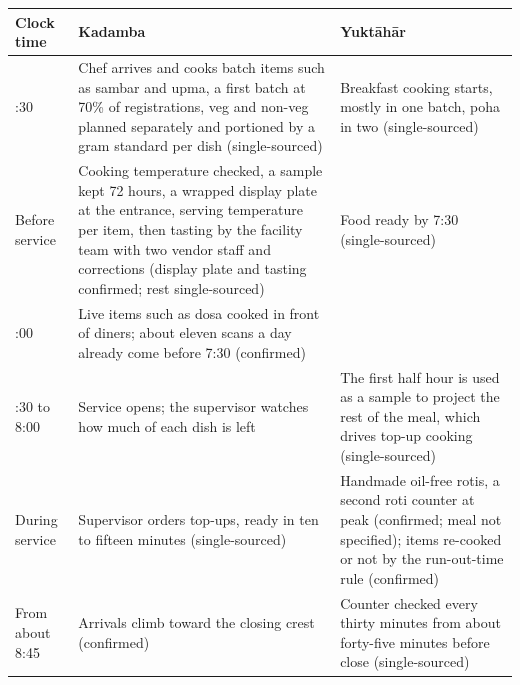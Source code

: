 \documentclass[
  10pt,
  table]{article}
\newcounter{none} %
\begin{document}
{\def\LTcaptype{none} %
\begin{longtable}[]{@{}
  >{\raggedright\arraybackslash}p{}
  >{\raggedright\arraybackslash}p{}
  >{\raggedright\arraybackslash}p{}@{}}
\toprule\noalign{}
\begin{minipage}[b]{\linewidth}\raggedright
\cellcolor{pblue}\color{white}\bfseries Clock time
\end{minipage} & \begin{minipage}[b]{\linewidth}\raggedright
\cellcolor{pblue}\color{white}\bfseries Kadamba
\end{minipage} & \begin{minipage}[b]{\linewidth}\raggedright
\cellcolor{pblue}\color{white}\bfseries Yuktāhār
\end{minipage} \\
\midrule\noalign{}
\endhead
\bottomrule\noalign{}
\endlastfoot
5:30 & Chef arrives and cooks batch items such as sambar and upma, a first batch at 70\% of registrations, veg and non-veg planned separately and portioned by a gram standard per dish (single-sourced) & Breakfast cooking starts, mostly in one batch, poha in two (single-sourced) \\
Before service & Cooking temperature checked, a sample kept 72 hours, a wrapped display plate at the entrance, serving temperature per item, then tasting by the facility team with two vendor staff and corrections (display plate and tasting confirmed; rest single-sourced) & Food ready by 7:30 (single-sourced) \\
7:00 & Live items such as dosa cooked in front of diners; about eleven scans a day already come before 7:30 (confirmed) & \\
7:30 to 8:00 & Service opens; the supervisor watches how much of each dish is left & The first half hour is used as a sample to project the rest of the meal, which drives top-up cooking (single-sourced) \\
During service & Supervisor orders top-ups, ready in ten to fifteen minutes (single-sourced) & Handmade oil-free rotis, a second roti counter at peak (confirmed; meal not specified); items re-cooked or not by the run-out-time rule (confirmed) \\
From about 8:45 & Arrivals climb toward the closing crest (confirmed) & Counter checked every thirty minutes from about forty-five minutes before close (single-sourced) \\

\end{longtable}}
\end{document}
